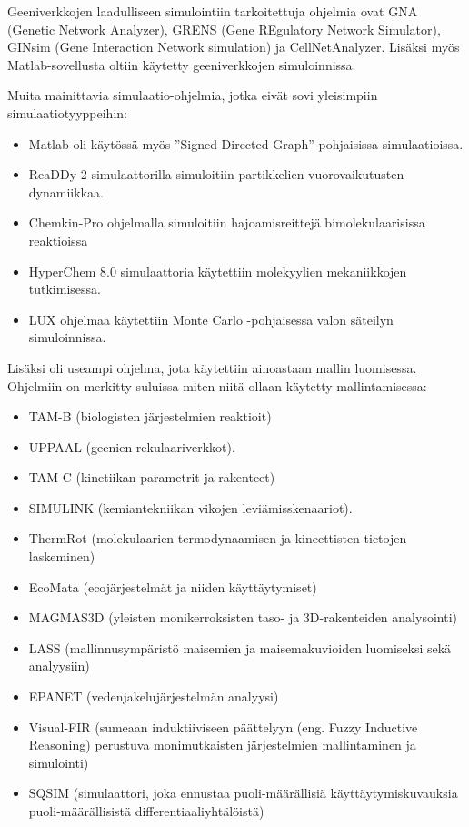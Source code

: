 \documentclass[utf8]{gradu3}
\begin{document}
Geeniverkkojen laadulliseen simulointiin tarkoitettuja ohjelmia ovat
GNA (Genetic Network Analyzer), 
GRENS (Gene REgulatory Network Simulator),
GINsim (Gene Interaction Network simulation) ja CellNetAnalyzer.
Lisäksi myös Matlab-sovellusta oltiin käytetty geeniverkkojen simuloinnissa.

Muita mainittavia simulaatio-ohjelmia, jotka eivät sovi yleisimpiin 
simulaatiotyyppeihin:
\begin{itemize}
    \item Matlab oli käytössä myös ''Signed Directed Graph'' pohjaisissa simulaatioissa.
    \item ReaDDy 2 simulaattorilla simuloitiin partikkelien vuorovaikutusten dynamiikkaa.
    \item Chemkin-Pro ohjelmalla simuloitiin hajoamisreittejä bimolekulaarisissa reaktioissa
    \item HyperChem 8.0 simulaattoria käytettiin molekyylien mekaniikkojen tutkimisessa.
    \item LUX ohjelmaa käytettiin Monte Carlo -pohjaisessa valon säteilyn simuloinnissa.
\end{itemize}

Lisäksi oli useampi ohjelma, jota käytettiin ainoastaan mallin luomisessa.
Ohjelmiin on merkitty suluissa miten niitä ollaan käytetty mallintamisessa:
\begin{itemize}
    \item TAM-B (biologisten järjestelmien reaktioit)
    \item UPPAAL (geenien rekulaariverkkot).
    \item TAM-C (kinetiikan parametrit ja rakenteet)
    \item SIMULINK (kemiantekniikan vikojen leviämisskenaariot).
    \item ThermRot (molekulaarien termodynaamisen ja kineettisten tietojen laskeminen)
    \item EcoMata (ecojärjestelmät ja niiden käyttäytymiset)
    \item MAGMAS3D (yleisten monikerroksisten taso- ja 3D-rakenteiden analysointi)
    \item LASS (mallinnusympäristö maisemien ja maisemakuvioiden luomiseksi sekä analyysiin)
    \item EPANET (vedenjakelujärjestelmän analyysi)
    \item Visual-FIR (sumeaan induktiiviseen päättelyyn (eng. Fuzzy Inductive Reasoning) perustuva monimutkaisten järjestelmien mallintaminen ja simulointi)
    \item SQSIM (simulaattori, joka ennustaa puoli-määrällisiä käyttäytymiskuvauksia puoli-määrällisistä differentiaaliyhtälöistä)
\end{itemize}
\end{document}
